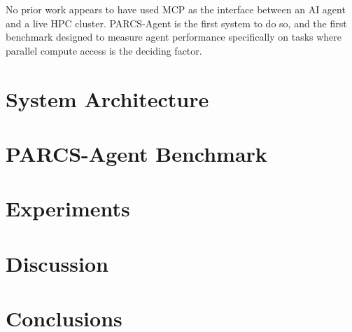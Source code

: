 \documentclass[preprints,article,submit,pdftex,moreauthors]{Definitions/mdpi}
\begin{document}
No prior work appears to have used MCP as the interface between an AI agent and a live HPC cluster. PARCS-Agent is the first system to do so, and the first benchmark designed to measure agent performance specifically on tasks where parallel compute access is the deciding factor.

\section{System Architecture}

\section{PARCS-Agent Benchmark}

\section{Experiments}

\section{Discussion}

\section{Conclusions}

\vspace{6pt} 



\end{document}
